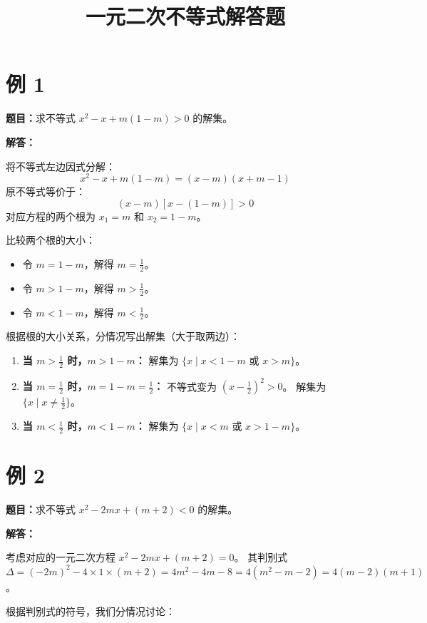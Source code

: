 \documentclass[UTF8]{article}
\title{一元二次不等式解答题}
\author{}
\date{}
\begin{document}
	
	
	\section*{例 1}
	\textbf{题目：}求不等式 \(x^2 - x + m(1-m) > 0\) 的解集。
	
	\vspace{0.5cm}
	\textbf{解答：}
	
	将不等式左边因式分解：
	\[
	x^2 - x + m(1-m) = (x-m)(x + m - 1)
	\]
	原不等式等价于：
	\[
	(x-m)[x - (1-m)] > 0
	\]
	对应方程的两个根为 \(x_1 = m\) 和 \(x_2 = 1 - m\)。
	
	比较两个根的大小：
	\begin{itemize}
		\item 令 \(m = 1 - m\)，解得 \(m = \frac{1}{2}\)。
		\item 令 \(m > 1 - m\)，解得 \(m > \frac{1}{2}\)。
		\item 令 \(m < 1 - m\)，解得 \(m < \frac{1}{2}\)。
	\end{itemize}
	
	根据根的大小关系，分情况写出解集（大于取两边）：
	
	\begin{enumerate}
		\item \textbf{当 \(m > \frac{1}{2}\) 时，\(m > 1-m\)：}
		解集为 \(\{x \mid x < 1-m \text{ 或 } x > m\}\)。
		
		\item \textbf{当 \(m = \frac{1}{2}\) 时，\(m = 1-m = \frac{1}{2}\)：}
		不等式变为 \((x - \frac{1}{2})^2 > 0\)。
		解集为 \(\{x \mid x \neq \frac{1}{2}\}\)。
		
		\item \textbf{当 \(m < \frac{1}{2}\) 时，\(m < 1-m\)：}
		解集为 \(\{x \mid x < m \text{ 或 } x > 1-m\}\)。
	\end{enumerate}
	
	\newpage
	
	\section*{例 2}
	\textbf{题目：}求不等式 \(x^2 - 2mx + (m+2) < 0\) 的解集。
	
	\vspace{0.5cm}
	\textbf{解答：}
	
	考虑对应的一元二次方程 \(x^2 - 2mx + (m+2) = 0\)。
	其判别式 \(\Delta = (-2m)^2 - 4 \times 1 \times (m+2) = 4m^2 - 4m - 8 = 4(m^2 - m - 2) = 4(m-2)(m+1)\)。
	
	根据判别式的符号，我们分情况讨论：
	
\end{document}
